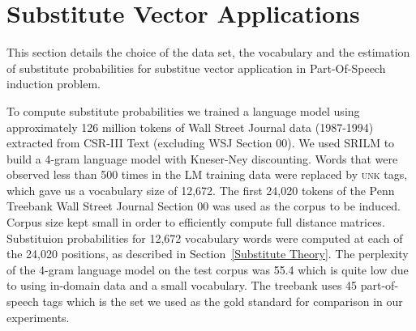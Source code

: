 \section{Substitute Vector Applications}
This section details the choice of the data set, the vocabulary and
the estimation of substitute probabilities for substitue vector
application in Part-Of-Speech induction problem.

To compute substitute probabilities we trained a language model using
approximately 126 million tokens of Wall Street Journal data
(1987-1994) extracted from CSR-III Text \cite{csr3text} (excluding WSJ
Section 00).
We used SRILM \cite{Stolcke2002} to build a 4-gram language model with
Kneser-Ney discounting.
Words that were observed less than 500 times in the LM training data
were replaced by \textsc{unk} tags, which gave us a vocabulary size of
12,672.
The first 24,020 tokens of the Penn Treebank \cite{treebank3} Wall
Street Journal Section 00 was used as the corpus to be induced.
Corpus size kept small in order to efficiently compute full distance
matrices.  Substituion probabilities for 12,672 vocabulary words were
computed at each of the 24,020 positions, as described in
Section~\ref{Substitute Theory}.
The perplexity of the 4-gram language model on the test corpus was
55.4 which is quite low due to using in-domain data and a small
vocabulary.
The treebank uses 45 part-of-speech tags which is the set we used as
the gold standard for comparison in our experiments.  
